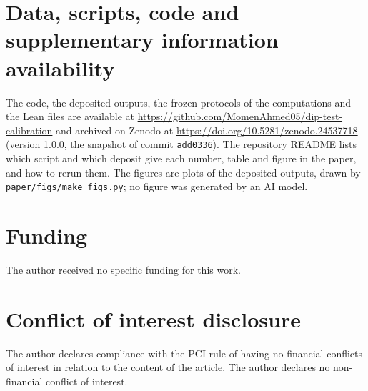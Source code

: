 \section*{Data, scripts, code and supplementary information availability}
The code, the deposited outputs, the frozen protocols of the computations and the Lean files are available at \url{https://github.com/MomenAhmed05/dip-test-calibration} and archived on Zenodo at \url{https://doi.org/10.5281/zenodo.24537718} (version 1.0.0, the snapshot of commit \texttt{add0336}). The repository README lists which script and which deposit give each number, table and figure in the paper, and how to rerun them. The figures are plots of the deposited outputs, drawn by \texttt{paper/figs/make\_figs.py}; no figure was generated by an AI model.

\section*{Funding}
The author received no specific funding for this work.

\section*{Conflict of interest disclosure}
The author declares compliance with the PCI rule of having no financial conflicts of interest in relation to the content of the article. The author declares no non-financial conflict of interest.
